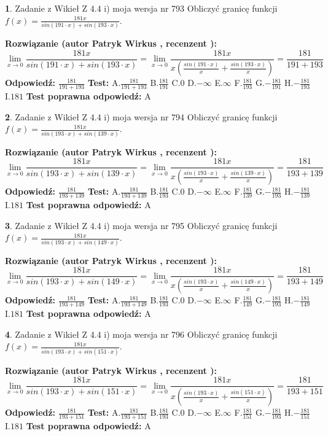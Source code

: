 \documentclass[12pt, a4paper]{article}
\theoremstyle{definition} %
\newtheorem{zad}{}
\newcommand{\zadStart}[1]{\begin{zad}#1\newline}
\newcommand{\zadStop}{\end{zad}}
\newcommand{\rozwStart}[2]{\noindent \textbf{Rozwiązanie (autor #1 , recenzent #2): }\newline}
\newcommand{\rozwStop}{\newline}
\newcommand{\odpStart}{\noindent \textbf{Odpowiedź:}\newline}
\newcommand{\odpStop}{\newline}
\newcommand{\testStart}{\noindent \textbf{Test:}\newline}
\newcommand{\testStop}{\newline}
\newcommand{\kluczStart}{\noindent \textbf{Test poprawna odpowiedź:}\newline}
\newcommand{\kluczStop}{\newline}
\begin{document}
\zadStart{Zadanie z Wikieł Z 4.4 i) moja wersja nr 793}
Obliczyć granicę funkcji $f(x)=\frac{181x}{sin(191\cdot x) +sin(193\cdot x)}$.
\zadStop
\rozwStart{Patryk Wirkus}{}
$$\lim\limits_{x\to 0}\frac{181x}{sin(191\cdot x) +sin(193\cdot x)}=\lim\limits_{x\to 0}\frac{181x}{x(\frac{sin(191\cdot x)}{x}+\frac{sin(193\cdot x)}{x})}=\frac{181}{191+193}$$
\rozwStop
\odpStart
$\frac{181}{191+193}$
\odpStop
\testStart
A.$\frac{181}{191+193}$
B.$\frac{181}{191}$
C.$0$
D.$-\infty$
E.$\infty$
F.$\frac{181}{193}$
G.$-\frac{181}{191}$
H.$-\frac{181}{193}$
I.$181$
\testStop
\kluczStart
A
\kluczStop



\zadStart{Zadanie z Wikieł Z 4.4 i) moja wersja nr 794}
Obliczyć granicę funkcji $f(x)=\frac{181x}{sin(193\cdot x) +sin(139\cdot x)}$.
\zadStop
\rozwStart{Patryk Wirkus}{}
$$\lim\limits_{x\to 0}\frac{181x}{sin(193\cdot x) +sin(139\cdot x)}=\lim\limits_{x\to 0}\frac{181x}{x(\frac{sin(193\cdot x)}{x}+\frac{sin(139\cdot x)}{x})}=\frac{181}{193+139}$$
\rozwStop
\odpStart
$\frac{181}{193+139}$
\odpStop
\testStart
A.$\frac{181}{193+139}$
B.$\frac{181}{193}$
C.$0$
D.$-\infty$
E.$\infty$
F.$\frac{181}{139}$
G.$-\frac{181}{193}$
H.$-\frac{181}{139}$
I.$181$
\testStop
\kluczStart
A
\kluczStop



\zadStart{Zadanie z Wikieł Z 4.4 i) moja wersja nr 795}
Obliczyć granicę funkcji $f(x)=\frac{181x}{sin(193\cdot x) +sin(149\cdot x)}$.
\zadStop
\rozwStart{Patryk Wirkus}{}
$$\lim\limits_{x\to 0}\frac{181x}{sin(193\cdot x) +sin(149\cdot x)}=\lim\limits_{x\to 0}\frac{181x}{x(\frac{sin(193\cdot x)}{x}+\frac{sin(149\cdot x)}{x})}=\frac{181}{193+149}$$
\rozwStop
\odpStart
$\frac{181}{193+149}$
\odpStop
\testStart
A.$\frac{181}{193+149}$
B.$\frac{181}{193}$
C.$0$
D.$-\infty$
E.$\infty$
F.$\frac{181}{149}$
G.$-\frac{181}{193}$
H.$-\frac{181}{149}$
I.$181$
\testStop
\kluczStart
A
\kluczStop



\zadStart{Zadanie z Wikieł Z 4.4 i) moja wersja nr 796}
Obliczyć granicę funkcji $f(x)=\frac{181x}{sin(193\cdot x) +sin(151\cdot x)}$.
\zadStop
\rozwStart{Patryk Wirkus}{}
$$\lim\limits_{x\to 0}\frac{181x}{sin(193\cdot x) +sin(151\cdot x)}=\lim\limits_{x\to 0}\frac{181x}{x(\frac{sin(193\cdot x)}{x}+\frac{sin(151\cdot x)}{x})}=\frac{181}{193+151}$$
\rozwStop
\odpStart
$\frac{181}{193+151}$
\odpStop
\testStart
A.$\frac{181}{193+151}$
B.$\frac{181}{193}$
C.$0$
D.$-\infty$
E.$\infty$
F.$\frac{181}{151}$
G.$-\frac{181}{193}$
H.$-\frac{181}{151}$
I.$181$
\testStop
\kluczStart
A
\kluczStop
\end{document}
